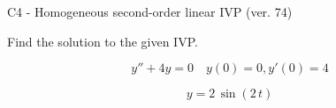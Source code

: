 \begin{exercise}
  \begin{exerciseTitle}C4 - Homogeneous second-order linear IVP (ver. 74)\end{exerciseTitle}
  \begin{exerciseStatement}
    
Find the solution to the given IVP.

    
\[y''+4y = 0 \hspace{1em} y(0) = 0 , y'(0) = 4\]

  \end{exerciseStatement}
  \begin{exerciseAnswer}
    
\[y= 2 \, \sin\left(2 \, t\right)\]

  \end{exerciseAnswer}
\end{exercise}